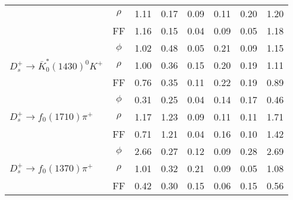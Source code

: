 {\begin{table*}[tp]
\begin{tabular}{l|ccccccc}
                                                                                        & $\rho$        &1.11      &0.17       &0.09   &0.11  &0.20  &1.20 \\
                                                                                        & FF            &1.16      &0.15       &0.04   &0.09  &0.05  &1.18 \\
            \hline                                                                                                                                         
            \multirow{3}{*}{$D_{s}^{+} \rightarrow \bar{K}^{*}_{0}(1430)^{0}K^{+}$}     & $\phi$        &1.02      &0.48       &0.05   &0.21  &0.09  &1.15     \\
                                                                                        & $\rho$        &1.00      &0.36       &0.15   &0.20  &0.19  &1.11 \\
                                                                                        & FF            &0.76      &0.35       &0.11   &0.22  &0.19  &0.89 \\
            \hline                                                                                                                                         
            \multirow{3}{*}{$D_{s}^{+} \rightarrow f_{0}(1710)\pi^{+}$}                 & $\phi$        &0.31      &0.25       &0.04   &0.14  &0.17  &0.46 \\
                                                                                        & $\rho$        &1.17      &1.23       &0.09   &0.11  &0.11  &1.71 \\
                                                                                        & FF            &0.71      &1.21       &0.04   &0.16  &0.10  &1.42 \\
            \hline                                                                                                                                         
            \multirow{3}{*}{$D_{s}^{+} \rightarrow f_{0}(1370)\pi^{+}$}                 & $\phi$        &2.66      &0.27       &0.12   &0.09  &0.28  &2.69  \\
                                                                                        & $\rho$        &1.01      &0.32       &0.21   &0.09  &0.05  &1.08 \\
                                                                                        & FF            &0.42      &0.30       &0.15   &0.06  &0.15  &0.56 \\
            \hline\hline
        \end{tabular}  
    \end{table*}  
    
}
